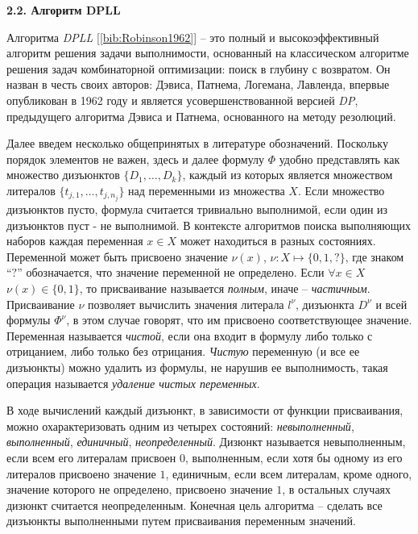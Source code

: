 \vspace{5pt}
\textbf{2.2. Алгоритм DPLL}\label{chapters:2.2}
\vspace{5pt}

Алгоритма \textit{DPLL} [\ref{bib:Robinson1962}] -- это полный и высокоэффективный алгоритм решения задачи выполнимости, основанный на классическом алгоритме решения задач комбинаторной оптимизации: поиск в глубину с возвратом. Он назван в честь своих авторов: Дэвиса, Патнема, Логемана, Лавленда, впервые опубликован в 1962 году и является усовершенствованной версией \textit{DP}, предыдущего алгоритма Дэвиса и Патнема, основанного на методу резолюций.

Далее введем несколько общепринятых в литературе обозначений. 
Поскольку порядок элементов не важен, здесь и далее формулу $\Phi$ 
удобно представлять как множество дизъюнктов $\{ D_1, \dots, D_k \}$, 
каждый из которых является множеством литералов $\{ t_{j,1}, \dots ,t_{j,n_j} \}$ над переменными из множества $X$. Если множество дизъюнктов пусто, формула считается тривиально выполнимой, если один из дизъюнктов пуст - не выполнимой.
В контексте алгоритмов поиска выполняющих наборов каждая переменная $x \in  X$ может находиться в разных состояниях. Переменной может быть присвоено значение $\nu(x)$, $\nu: X \mapsto \{ 0, 1, ?\}$, где знаком \enquote{$?$} обозначается, что значение переменной не определено. Если $\forall x \in X $ $\nu(x) \in \{ 0, 1\}$, то присваивание называется \textit{полным}, иначе -- \textit{частичным}. Присваивание $\nu$ позволяет вычислить значения литерала $l^{\nu}$, дизъюнкта $D^{\nu}$ и всей формулы $\Phi^{\nu}$, в этом случае говорят, что им присвоено соответствующее значение. Переменная называется \textit{чистой}, 
если она входит в формулу либо только с отрицанием, либо только без отрицания. \textit{Чистую} переменную (и все ее дизъюнкты) можно удалить из формулы, не нарушив ее выполнимость, такая операция называется \textit{удаление чистых переменных}. 

В ходе вычислений каждый дизъюнкт, в зависимости от функции присваивания, можно охарактеризовать одним из четырех состояний: \textit{невыполненный}, \textit{выполненный}, \textit{единичный}, \textit{неопределенный}. Дизюнкт называется невыполненным, если всем его литералам присвоен $0$, выполненным, если хотя бы одному из его литералов присвоено значение $1$, единичным, если всем литералам, кроме одного, значение которого не определено, присвоено значение $1$, в остальных случаях дизюнкт считается неопределенным. Конечная цель алгоритма -- сделать все дизъюнкты выполненными путем присваивания переменным значений.

